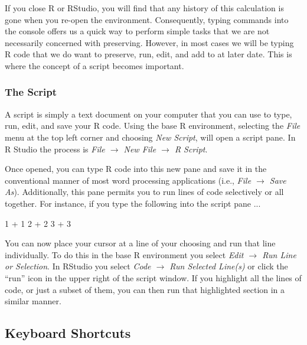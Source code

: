 \vspace{1em}

If you close R or RStudio, you will find that any history of this calculation is gone when you re-open the environment.  Consequently, typing commands into the console offers us a quick way to perform simple tasks that we are not necessarily concerned with preserving.  However, in most cases we will be typing R code that we do want to preserve, run, edit, and add to at later date.  This is where the concept of a \gls{script} becomes important.

\subsubsection{The Script}

A script is simply a text document on your computer that you can use to type, run, edit, and save your R code. Using the base R environment, selecting the \textit{File} menu at the top left corner and choosing \textit{New Script}, will open a script pane.  In R Studio the process is \textit{File $\rightarrow$ New File $\rightarrow$ R Script}.  

Once opened, you can type R code into this new pane and save it in the conventional manner of most word processing applications (i.e., \textit{File $\rightarrow$ Save As}). Additionally, this pane permits you to run lines of code selectively or all together. For instance, if you type the following into the script pane ...

\begin{inR}
1 + 1
2 + 2
3 + 3
\end{inR}

\medskip

You can now place your cursor at a line of your choosing and run that line individually.  To do this in the base R environment you select \textit{Edit $\rightarrow$ Run Line or Selection}.  In RStudio you select \textit{Code $\rightarrow$ Run Selected Line(s)} or click the ``run'' icon in the upper right of the script window. If you highlight all the lines of code, or just a subset of them, you can then run that highlighted section in a similar manner.

\subsection{Keyboard Shortcuts}
\label{sec:key_short}

